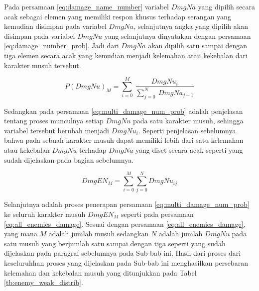 Pada persamaan \ref{eq:damage_name_number} variabel $DmgNa$ yang dipilih secara acak sebagai elemen yang memiliki respon khusus terhadap serangan yang kemudian disimpan pada variabel $DmgNu$, selanjutnya angka yang dipilih akan disimpan pada variabel $DmgNu$ yang selanjutnya dinyatakan dengan persamaan \ref{eq:damage_number_prob}. Jadi dari $DmgNa$ akan dipilih satu sampai dengan tiga elemen secara acak yang kemudian menjadi kelemahan atau kekebalan dari karakter musuh tersebut.

\begin{equation}\label{eq:multi_damage_num_prob}
P(DmgNu)_{M} = \sum_{i = 0}^{M}\ \frac{DmgNu_{i}}{\sum_{j = 0}^{N}\ DmgNa_{j - 1}}
\end{equation}

Sedangkan pada persamaan \ref{eq:multi_damage_num_prob} adalah penjelasan tentang proses munculnya setiap $DmgNu$ pada satu karakter musuh, sehingga variabel tersebut berubah menjadi $DmgNu_{i}$. Seperti penjelasan sebelumnya bahwa pada sebuah karakter musuh dapat memiliki lebih dari satu kelemahan atau kekebalan $DmgNu$ terhadap $DmgNa$ yang diset secara acak seperti yang sudah dijelaskan pada bagian sebelumnya.

\begin{equation}\label{eq:all_enemies_damage}
DmgEN_{M} = \sum_{i = 0}^{M}\sum_{j = 0}^{N} DmgNu_{ij}
\end{equation}

Selanjutnya adalah proses penerapan persamaan \ref{eq:multi_damage_num_prob} ke seluruh karakter musuh $DmgEN_{M}$ seperti pada persamaan \ref{eq:all_enemies_damage}. Sesuai dengan persamaan \ref{eq:all_enemies_damage}, yang mana $M$ adalah jumlah musuh sedangkan $N$ adalah jumlah $DmgNu$ pada satu musuh yang berjumlah satu sampai dengan tiga seperti yang sudah dijelaskan pada paragraf sebelumnya pada Sub-bab ini. Hasil dari proses dari keseluruhhan proses yang dijelaskan pada Sub-bab ini menghasilkan persebaran kelemahan dan kekebalan musuh yang ditunjukkan pada Tabel \ref{tb:enemy_weak_distrib}.
\vspace{1ex}

